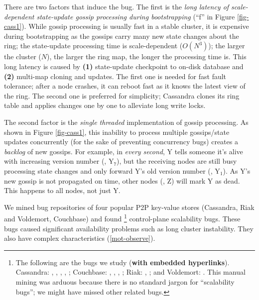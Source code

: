 There are two factors that induce the bug.  The first is the {\em long latency
of scale-dependent state-update gossip processing during bootstrapping} (``f''
in Figure \ref{fig-cass1}).  While gossip processing is usually fast in a stable
cluster, it is expensive during bootstrapping as the gossips carry many new
state changes about the ring; the state-update processing time is
scale-dependent ($O(N^3)$); the larger the cluster ($N$), the larger the ring
map, the longer the processing time is.
%
This long latency is caused by {\bf (1)} state-update checkpoint to on-disk
database and {\bf (2)} multi-map cloning and updates.
%
The first one is needed for fast fault tolerance; after a node crashes, it can
reboot fast as it knows the latest view of the ring.
%
The second one is preferred for simplicity; Cassandra clones its 
ring table and applies changes one by one to alleviate long write locks.
%

The second factor is the {\em single threaded} implementation of gossip
processing.  As shown in Figure \ref{fig-cass1},  this inability to process
multiple gossips/state updates concurrently (for the sake of preventing
concurrency bugs) creates a {\em backlog} of new gossips.  For example, in {\em
every second}, Y tells someone it's alive with increasing version number (\eg,
Y$_7$), but the receiving nodes are still busy processing state changes and only
forward Y's old version number (\eg, Y$_1$).  As Y's new gossip is not
propagated on time,  other nodes (\eg, Z) will mark Y as dead.  This happens to
all nodes, not just Y.


We mined bug repositories of four popular P2P key-value stores 
(Cassandra, Riak and 
Voldemort, Couchbase) and found \numStudy\footnote{The following are the 
  bugs we study (\textbf{with embedded hyperlinks}).
%
Cassandra: \caa, \cab, \cac, \cad, \cae ;
%
Couchbase: \cba, \cbb, \cbc, \cbd ;
%
Riak: \rka, \rkb ; and 
%
Voldemort: \vda.
%
This manual mining was arduous because there is no
standard jargon for ``scalability bugs'';
we might have missed other related bugs.
%
} control-plane scalability bugs.
%
These bugs caused significant availability problems such as long cluster
instability.
%
They also have complex characteristics (\sec\ref{mot-observe}).
\fi

